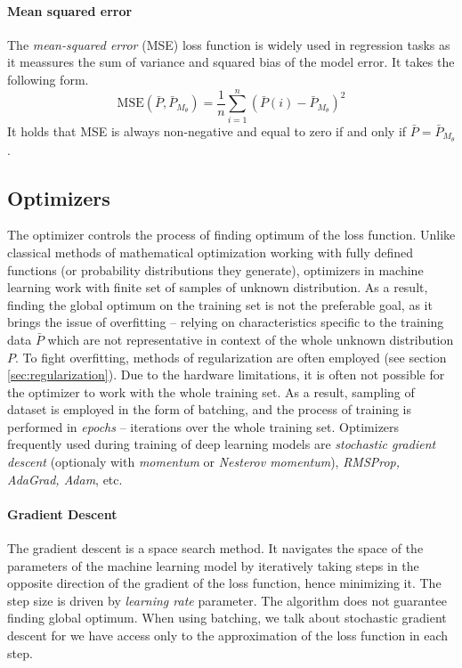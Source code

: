 \paragraph{Mean squared error}
The \emph{mean-squared error} (MSE) loss function is widely used in regression tasks as it meassures the sum of variance and squared bias of the model error. It takes the following form.
\begin{equation} \label{eqn:mse}
\text{MSE}(\bar{P}, \bar{P}_{M_\theta}) = \frac{1}{n} \sum\limits_{i=1}^{n} (\bar{P}(i) - \bar{P}_{M_\theta})^2
\end{equation}
It holds that MSE is always non-negative and equal to zero if and only if $\bar{P} = \bar{P}_{M_\theta}$.

\subsection{Optimizers}
\label{sec:optimizers}

The optimizer controls the process of finding optimum of the loss function. Unlike classical methods of mathematical optimization working with fully defined functions (or probability distributions they generate), optimizers in machine learning work with finite set of samples of unknown distribution. As a result, finding the global optimum on the training set is not the preferable goal, as it brings the issue of overfitting -- relying on characteristics specific to the training data $\bar{P}$ which are not representative in context of the whole unknown distribution $P$. To fight overfitting, methods of regularization are often employed (see section \ref{sec:regularization}). Due to the hardware limitations, it is often not possible for the optimizer to work with the whole training set. As a result, sampling of dataset is employed in the form of batching, and the process of training is performed in \emph{epochs} -- iterations over the whole training set. Optimizers frequently used during training of deep learning models are \emph{stochastic gradient descent} (optionaly with \emph{momentum} or \emph{Nesterov momentum}), \emph{RMSProp, AdaGrad, Adam}, etc.

\paragraph{Gradient Descent}

The gradient descent is a space search method. It navigates the space of the parameters of the machine learning model by iteratively taking steps in the opposite direction of the gradient of the loss function, hence minimizing it. The step size is driven by \emph{learning rate} parameter. The algorithm does not guarantee finding global optimum. When using batching, we talk about stochastic gradient descent for we have access only to the approximation of the loss function in each step.

